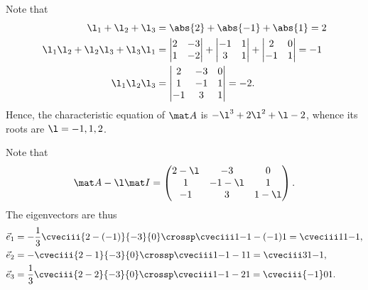 \begin{solution}
    Note that
    \begin{align*}
        \l_1 + \l_2 + \l_3 &= \abs{2} + \abs{-1} + \abs{1} = 2\\
        \l_1 \l_2 + \l_2 \l_3 + \l_3 \l_1 &= \begin{vmatrix}2 & -3 \\ 1 & -2\end{vmatrix} + \begin{vmatrix}-1 & 1 \\ 3 & 1\end{vmatrix} + \begin{vmatrix}2 & 0 \\ -1 & 1\end{vmatrix} = -1 \\
        \l_1 \l_2 \l_3 &= \begin{vmatrix}2 & -3 & 0 \\ 1 & - 1 & 1 \\ - 1 & 3 & 1\end{vmatrix} = -2.
    \end{align*}
    Hence, the characteristic equation of $\mat A$ is $-\l^3 + 2 \l^2 + \l - 2$, whence its roots are $\l = -1, 1, 2$.

    Note that \[\mat A -\l \mat I = \begin{pmatrix}2 - \l & -3 & 0 \\ 1 & -1 -\l & 1 \\ -1 & 3 & 1 -\l\end{pmatrix}.\] The eigenvectors are thus
    \begin{align*}
        \vec e_1 &= -\frac13 \cveciii{2-(-1)}{-3}{0} \crossp \cveciii1{-1-(-1)}{1} = \cveciii11{-1},\\
        \vec e_2 &= -\cveciii{2-1}{-3}{0} \crossp \cveciii1{-1-1}{1} = \cveciii31{-1},\\
        \vec e_3 &= \frac13 \cveciii{2-2}{-3}{0} \crossp \cveciii1{-1-2}{1} = \cveciii{-1}01.
    \end{align*}


\end{solution}
